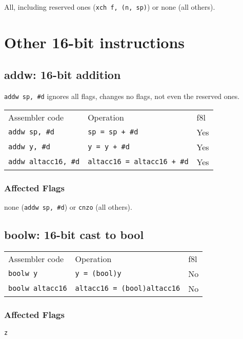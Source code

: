 \documentclass{book}
\begin{document}
All, including reserved ones (\texttt{xch f, (n, sp)}) or none (all others).

\section{Other 16-bit instructions}

\subsection{addw: 16-bit addition}

\texttt{addw sp, \#d} ignores all flags, changes no flags, not even the reserved ones.

\begin{tabular}{l l l}
Assembler code              & Operation                          & f8l \\
\texttt{addw sp, \#d}       & \texttt{sp = sp + \#d}             & Yes \\
\texttt{addw y, \#d}        & \texttt{y = y + \#d}               & Yes \\
\texttt{addw altacc16, \#d} & \texttt{altacc16 = altacc16 + \#d} & Yes
\end{tabular}

\subsubsection*{Affected Flags}

none (\texttt{addw sp, \#d}) or \texttt{cnzo} (all others).


\subsection{boolw: 16-bit cast to bool}

\begin{tabular}{l l l}
Assembler code          & Operation                          & f8l \\
\texttt{boolw y}        & \texttt{y = (bool)y}               & No \\
\texttt{boolw altacc16} & \texttt{altacc16 = (bool)altacc16} & No \\
\end{tabular}

\subsubsection*{Affected Flags}

\texttt{z}
\end{document}
